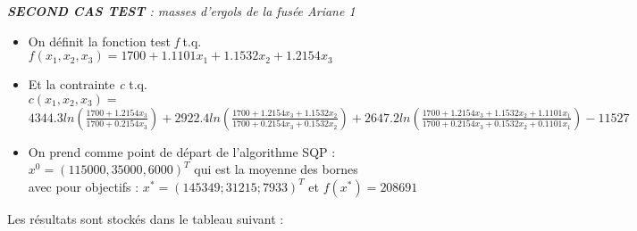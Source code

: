 \begin{center}\emph{\textbf{SECOND CAS TEST} : masses d'ergols de la fusée Ariane 1}\\\end{center}





\begin{itemize}
\item On définit la fonction test \textit{f} t.q.\\
$f(x_1,x_2,x_3) = 1700+1.1101x_1 + 1.1532x_2 + 1.2154x_3$\\
\item Et la contrainte \textit{c} t.q.\\
$c(x_1,x_2,x_3) =$\\
\smallbreak
$4344.3ln(\frac{1700+1.2154x_3}{1700+0.2154x_3}) 
+ 2922.4ln(\frac{1700+1.2154x_3+1.1532x_2}{1700+0.2154x_3+0.1532x_2}) 
+ 2647.2ln(\frac{1700+1.2154x_3+1.1532x_2+1.1101x_1}{1700+0.2154x_3+0.1532x_2+0.1101x_1}) 
-11527$

\bigbreak

\item On prend comme point de départ de l'algorithme SQP : $x^0 = (115000, 35000, 6000)^{T}$ qui est la moyenne des bornes\\
\indent avec pour objectifs : $x^{*} = (145349 ; 31215 ; 7933)^{T}$ et $f(x^{*}) = 208691$\\
\end{itemize}
Les résultats sont stockés dans le tableau suivant : \smallbreak

